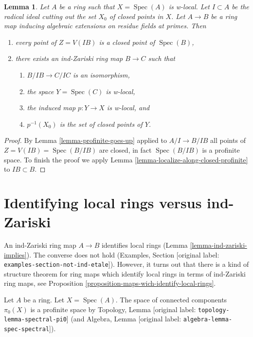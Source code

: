 \documentclass[10pt,a4paper]{article}
\theoremstyle{plain}
\newtheorem{lemma}[subsection]{Lemma}
\theoremstyle{definition}
\theoremstyle{remark}
\numberwithin{equation}{subsection}
\def\Spec{\mathop{\mathrm{Spec}}}
\begin{document}
\begin{lemma}
\label{lemma-w-local-algebraic-residue-field-extensions}
Let $A$ be a ring such that $X = \Spec(A)$ is w-local. Let $I \subset A$
be the radical ideal cutting out the set $X_0$ of closed points in $X$.
Let $A \to B$ be a ring map inducing algebraic extensions on residue
fields at primes. Then
\begin{enumerate}
\item every point of $Z = V(IB)$ is a closed point of $\Spec(B)$,
\item there exists an ind-Zariski ring map $B \to C$ such that
\begin{enumerate}
\item $B/IB \to C/IC$ is an isomorphism,
\item the space $Y = \Spec(C)$ is w-local,
\item the induced map $p : Y \to X$ is w-local, and
\item $p^{-1}(X_0)$ is the set of closed points of $Y$.
\end{enumerate}
\end{enumerate}
\end{lemma}

\begin{proof}
By Lemma \ref{lemma-profinite-goes-up} applied to $A/I \to B/IB$
all points of $Z = V(IB) = \Spec(B/IB)$ are closed, in fact $\Spec(B/IB)$
is a profinite space.
To finish the proof we apply Lemma \ref{lemma-localize-along-closed-profinite}
to $IB \subset B$.
\end{proof}





\section{Identifying local rings versus ind-Zariski}
\label{section-connected-components}

\noindent
An ind-Zariski ring map $A \to B$ identifies local rings
(Lemma \ref{lemma-ind-zariski-implies}). The converse does not hold
(Examples, Section \textnormal{[original label: \nolinkurl{examples-section-not-ind-etale}]}).
However, it turns out that there is a kind of structure theorem for
ring maps which identify local rings in terms of ind-Zariski
ring maps, see Proposition \ref{proposition-maps-wich-identify-local-rings}.

\medskip\noindent
Let $A$ be a ring. Let $X = \Spec(A)$. The space of connected
components $\pi_0(X)$ is a profinite space by
Topology, Lemma \textnormal{[original label: \nolinkurl{topology-lemma-spectral-pi0}]}
(and Algebra, Lemma \textnormal{[original label: \nolinkurl{algebra-lemma-spec-spectral}]}).
\end{document}
